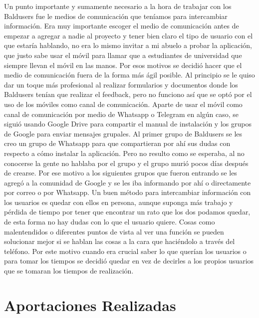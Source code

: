 Un punto importante y sumamente necesario a la hora de trabajar con los Baldusers fue le medios de comunicación que teníamos para intercambiar información.
Era muy importante escoger el medio de comunicación antes de empezar a agregar a nadie al proyecto y tener bien claro el tipo de usuario con el que estaría hablando, no era lo mismo invitar a mi abuelo a probar la aplicación, que justo sabe usar el móvil para llamar que a estudiantes de universidad que siempre llevan el móvil en las manos.
Por esos motivos se decidió hacer que el medio de comunicación fuera de la forma más ágil posible.
Al principio se le quiso dar un toque más profesional al realizar formularios y documentos donde los Baldusers tenían que realizar el feedback, pero no funciono así que se optó por el uso de los móviles como canal de comunicación.
Aparte de usar el móvil como canal de comunicación por medio de Whatsapp o Telegram en algún caso, se siguió usando Google Drive para compartir el manual de instalación y los grupos de Google para enviar mensajes grupales.
Al primer grupo de Baldusers se les creo un grupo de Whatsapp para que compartieran por ahí sus dudas con respecto a cómo instalar la aplicación. Pero no resulto como se esperaba, al no conocerse la gente no hablaba por el grupo y el grupo murió pocos días después de crearse.
Por ese motivo a los siguientes grupos que fueron entrando se les agregó a la comunidad de Google y se les iba informando por ahí o directamente por correo o por Whatsapp.
Un buen método para intercambiar información con los usuarios es quedar con ellos en persona, aunque suponga más trabajo y pérdida de tiempo por tener que encontrar un rato que los dos podamos quedar, de esta forma no hay dudas con lo que el usuario quiere.
Cosas como malentendidos o diferentes puntos de vista al ver una función se pueden solucionar mejor si se hablan las cosas a la cara que haciéndolo a través del teléfono.
Por este motivo cuando era crucial saber lo que querían los usuarios o para tomar los tiempos se decidió quedar en vez de decirles a los propios usuarios que se tomaran los tiempos de realización.


\section{Aportaciones Realizadas}
\label{secc:aportaciones Realizadas}

